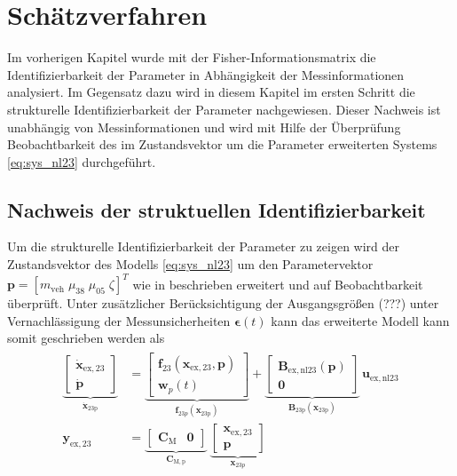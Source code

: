 \chapter{Schätzverfahren}\label{ch:ch3}
Im vorherigen Kapitel wurde mit der Fisher-Informationsmatrix die Identifizierbarkeit der Parameter in Abhängigkeit der Messinformationen analysiert. Im Gegensatz dazu wird in diesem Kapitel im ersten Schritt die strukturelle Identifizierbarkeit der Parameter nachgewiesen. Dieser Nachweis ist unabhängig von Messinformationen und wird mit Hilfe der Überprüfung Beobachtbarkeit des im Zustandsvektor um die Parameter erweiterten Systems \eqref{eq:sys_nl23} durchgeführt.

\section{Nachweis der struktuellen Identifizierbarkeit}
Um die strukturelle Identifizierbarkeit der Parameter zu zeigen wird der Zustandsvektor des Modells \eqref{eq:sys_nl23} um den Parametervektor $\pmb{p} = [m_\mathrm{veh}\; \mu_{38}\; \mu_{05}\; \zeta]^T$ wie in \cite[S. 445ff]{Bohn.2016} beschrieben erweitert und auf Beobachtbarkeit überprüft. Unter zusätzlicher Berücksichtigung der Ausgangsgrößen (???) unter Vernachlässigung der Messunsicherheiten $\pmb{\epsilon}(t)$ kann das erweiterte Modell kann somit geschrieben werden als
\begin{align}\label{eq:sys_nl23p}
\begin{split}
\underbrace{\begin{bmatrix}\dot{\pmb{x}}_\mathrm{ex,23} \\ \dot{\pmb{p}}\end{bmatrix}}_{\pmb{\dot{x}}_\mathrm{23p}} &= \underbrace{\begin{bmatrix} \pmb{f}_{23}(\pmb{x}_\mathrm{ex,23},\pmb{p}) \\\pmb{w}_p(t) \end{bmatrix}}_{\pmb{f}_{23p}(\pmb{x}_\mathrm{23p})} + \underbrace{\begin{bmatrix} \pmb{B}_\mathrm{ex,nl23}(\pmb{p}) \\ \pmb{0} \end{bmatrix}}_{\pmb{B}_\mathrm{23p}(\pmb{x}_\mathrm{23p})}\, \pmb{u}_\mathrm{ex,nl23}\\
\pmb{y}_\mathrm{ex,23} &= \underbrace{\begin{bmatrix} \pmb{C}_\mathrm{M}& \pmb{0} \end{bmatrix}}_{\pmb{C}_\mathrm{M,p}}\ \underbrace{\begin{bmatrix}\pmb{x}_\mathrm{ex,23} \\ \pmb{p}\end{bmatrix}}_{\pmb{x}_{23p}}
\end{split}
\end{align}

